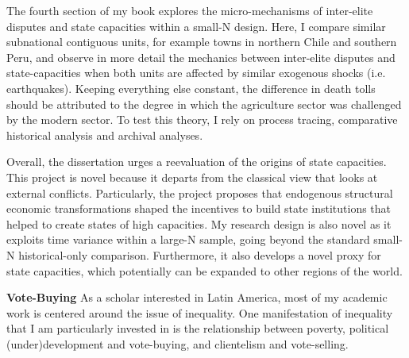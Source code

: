 \documentclass[11pt]{letter} %
\begin{document}
\begin{letter}{}
The fourth section of my book explores the micro-mechanisms of inter-elite disputes and state capacities within a small-N design. Here, I compare similar subnational contiguous units, for example towns in northern Chile and southern Peru, and observe in more detail the mechanics between inter-elite disputes and state-capacities when both units are affected by similar exogenous shocks (i.e. earthquakes). Keeping everything else constant, the difference in death tolls should be attributed to the degree in which the agriculture sector was challenged by the modern sector. To test this theory, I rely on process tracing, comparative historical analysis and archival analyses. 

Overall, the dissertation urges a reevaluation of the origins of state capacities. This project is novel because it departs from the classical view that looks at external conflicts. Particularly, the project proposes that endogenous structural economic transformations shaped the incentives to build state institutions that helped to create states of high capacities. My research design is also novel as it exploits time variance within a large-N sample, going beyond the standard small-N historical-only comparison. Furthermore, it also develops a novel proxy for state capacities, which potentially can be expanded to other regions of the world.


{\bf Vote-Buying} As a scholar interested in Latin America, most of my academic work is centered around the issue of inequality. One manifestation of inequality that I am particularly invested in is the relationship between poverty, political (under)development and vote-buying, and clientelism and vote-selling. 


\end{letter}
\end{document}
